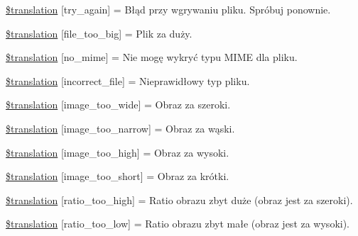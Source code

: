 \begin{DoxyCompactItemize}
\item 
\hyperlink{class_8upload_8pl___p_l_8php_a3afc377bd803683314f413a814243066}{\$translation} \mbox{[}\textquotesingle{}try\+\_\+again\textquotesingle{}\mbox{]} = \textquotesingle{}Błąd przy wgrywaniu pliku. Spróbuj ponownie.\textquotesingle{}
\item 
\hyperlink{class_8upload_8pl___p_l_8php_a476278eb4a0c3df56af068e2d511a741}{\$translation} \mbox{[}\textquotesingle{}file\+\_\+too\+\_\+big\textquotesingle{}\mbox{]} = \textquotesingle{}Plik za duży.\textquotesingle{}
\item 
\hyperlink{class_8upload_8pl___p_l_8php_a191a55df8e3bb7f3c51b70f3c1932e02}{\$translation} \mbox{[}\textquotesingle{}no\+\_\+mime\textquotesingle{}\mbox{]} = \textquotesingle{}Nie mogę wykryć typu M\+I\+M\+E dla pliku.\textquotesingle{}
\item 
\hyperlink{class_8upload_8pl___p_l_8php_a4d32343e2699edd6fd435f9c832cb9c7}{\$translation} \mbox{[}\textquotesingle{}incorrect\+\_\+file\textquotesingle{}\mbox{]} = \textquotesingle{}Nieprawidłowy typ pliku.\textquotesingle{}
\item 
\hyperlink{class_8upload_8pl___p_l_8php_a0dd3e4930ca1f59ae280f4b1006525cd}{\$translation} \mbox{[}\textquotesingle{}image\+\_\+too\+\_\+wide\textquotesingle{}\mbox{]} = \textquotesingle{}Obraz za szeroki.\textquotesingle{}
\item 
\hyperlink{class_8upload_8pl___p_l_8php_a5c9a4cd67fd21c32e0a3b434591a6037}{\$translation} \mbox{[}\textquotesingle{}image\+\_\+too\+\_\+narrow\textquotesingle{}\mbox{]} = \textquotesingle{}Obraz za wąski.\textquotesingle{}
\item 
\hyperlink{class_8upload_8pl___p_l_8php_aa27bde361343f3b63c7cd441860024f8}{\$translation} \mbox{[}\textquotesingle{}image\+\_\+too\+\_\+high\textquotesingle{}\mbox{]} = \textquotesingle{}Obraz za wysoki.\textquotesingle{}
\item 
\hyperlink{class_8upload_8pl___p_l_8php_a86fcd4e1157b00032df451188d735527}{\$translation} \mbox{[}\textquotesingle{}image\+\_\+too\+\_\+short\textquotesingle{}\mbox{]} = \textquotesingle{}Obraz za krótki.\textquotesingle{}
\item 
\hyperlink{class_8upload_8pl___p_l_8php_a23396f6ce7f31e5e5f1b57580621d982}{\$translation} \mbox{[}\textquotesingle{}ratio\+\_\+too\+\_\+high\textquotesingle{}\mbox{]} = \textquotesingle{}Ratio obrazu zbyt duże (obraz jest za szeroki).\textquotesingle{}
\item 
\hyperlink{class_8upload_8pl___p_l_8php_ac533b9a479f056b0b8623e4268f068c2}{\$translation} \mbox{[}\textquotesingle{}ratio\+\_\+too\+\_\+low\textquotesingle{}\mbox{]} = \textquotesingle{}Ratio obrazu zbyt małe (obraz jest za wysoki).\textquotesingle{}

\end{DoxyCompactItemize}
